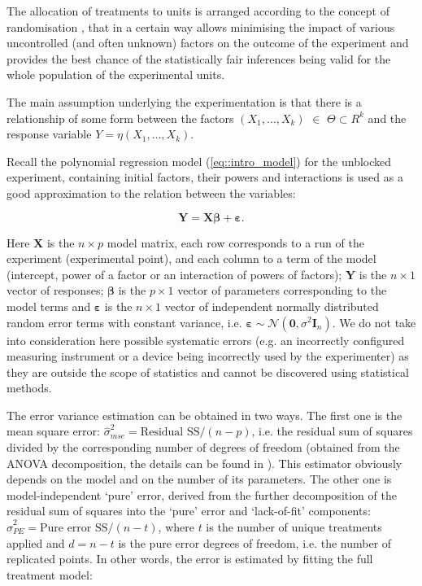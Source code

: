 The allocation of treatments to units is arranged according to the concept of randomisation \citep{MeadGilmour2012}, that in a certain way allows minimising the impact of various uncontrolled (and often unknown) factors on the outcome of the experiment and provides the best chance of the statistically fair inferences being valid for the whole population of the experimental units.  

The main assumption underlying the experimentation is that there is a relationship of some form between the factors $(X_1,\ldots, X_k)$ $\in$ $\Theta \subset R^{k}$ and the response variable $Y=\eta(X_1,\ldots, X_k).$ 

Recall the polynomial regression model (\ref{eq::intro_model}) for the unblocked experiment, containing initial factors, their powers and interactions is used as a good approximation to the relation between the variables:  

\begin{equation}
\label{eq::back_model}
\bm{Y}=\bm{X\beta}+\bm{\varepsilon}.
\end{equation} 

Here $\bm{X}$ is the $n\times p$ model matrix, each row corresponds to a run of the experiment (experimental point), and each column to a term of the model (intercept, power of a factor or an interaction of powers of factors); $\bm{Y}$ is the $n\times 1$ vector of responses; $\bm{\beta}$ is the $p\times 1$ vector of parameters corresponding to the model terms and $\bm{\varepsilon}$ is the $n\times 1$ vector of independent normally distributed random error terms with constant variance, i.e. $\bm{\varepsilon}\sim \mathcal{N}(\bm{0},\sigma^{2}\bm{I}_{n})$. We do not take into consideration here possible systematic errors (e.g. an incorrectly configured measuring instrument or a device being incorrectly used by the experimenter) as they are outside the scope of statistics and cannot be discovered using statistical methods.   

The error variance estimation can be obtained in two ways. The first one is the mean square error: $\hat{\sigma}^2_{mse}=\mbox{Residual SS}/(n-p)$, i.e. the residual sum of squares divided by the corresponding number of degrees of freedom (obtained from the ANOVA decomposition, the details can be found in \cite{Draper1998}). This estimator obviously depends on the model and on the number of its parameters. The other one is model-independent `pure' error, derived from the further decomposition of the residual sum of squares into the `pure' error and `lack-of-fit' components: $\hat{\sigma}^2_{PE}=\mbox{Pure error SS}/(n-t)$, where $t$ is the number of unique treatments applied and $d=n-t$ is the pure error degrees of freedom, i.e. the number of replicated points. In other words, the error is estimated by fitting the full treatment model:

